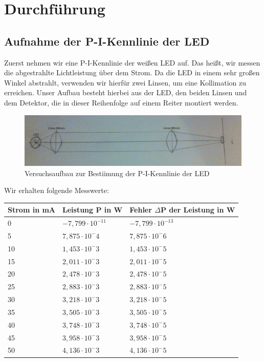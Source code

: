 \documentclass[bigchapter,colorback,accentcolor=tud4b,linedtoc,11pt]{tudreport}
\begin{document}
\chapter{Durchführung}
\section{Aufnahme der P-I-Kennlinie der LED}
\label{sec:pikennlinie}
Zuerst nehmen wir eine P-I-Kennlinie der weißen LED auf. Das heißt, wir messen die abgestrahlte Lichtleistung über dem Strom. Da die LED in einem sehr großen Winkel abstrahlt, verwenden wir hierfür zwei Linsen, um eine Kollimation zu erreichen. Unser Aufbau besteht hierbei aus der LED, den beiden Linsen und dem Detektor, die in dieser Reihenfolge auf einem Reiter montiert werden.

\begin{figure}[ht!]
\centering
\includegraphics[width=150mm]{img/skizzen/versuch_a.jpg}
\caption{Versuchsaufbau zur Bestiimung der P-I-Kennlinie der LED}
\label{PI-Kennlinie-LED}
\end{figure}

Wir erhalten folgende Messwerte:

\begin{center}
  \begin{tabular}{|p{3.5cm}|p{4cm}|p{5cm}|}
    \hline
        Strom in mA & Leistung P in W & Fehler $\Delta$P der Leistung in W \\ \hline
        0 & $-7,799 \cdot 10^{-11}$ & $-7,799 \cdot 10^{-13}$ \\ \hline
        5 & $7,875 \cdot 10^-4$ & $7,875 \cdot 10^-6$ \\ \hline
        10 & $1,453 \cdot 10^-3$ & $1,453 \cdot 10^-5$ \\ \hline
        15 & $2,011 \cdot 10^-3$ & $2,011 \cdot 10^-5$ \\ \hline
        20 & $2,478 \cdot 10^-3$ & $2,478 \cdot 10^-5$ \\ \hline
        25 & $2,883 \cdot 10^-3$ & $2,883 \cdot 10^-5$ \\ \hline
        30 & $3,218 \cdot 10^-3$ & $3,218 \cdot 10^-5$ \\ \hline
        35 & $3,505 \cdot 10^-3$ & $3,505 \cdot 10^-5$ \\ \hline
        40 & $3,748 \cdot 10^-3$ & $3,748 \cdot 10^-5$ \\ \hline
        45 & $3,958 \cdot 10^-3$ & $3,958 \cdot 10^-5$ \\ \hline
        50 & $4,136 \cdot 10^-3$ & $4,136 \cdot 10^-5$ \\ \hline
	\end{tabular}
\end{center}
\end{document}
